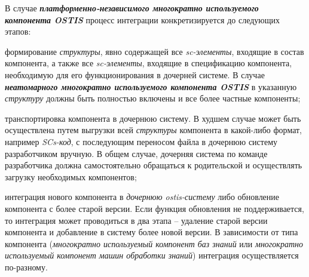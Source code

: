 \begin{SCn}
{В случае \textbf{\textit{платформенно-независимого многократно используемого компонента OSTIS }} процесс интеграции конкретизируется до следующих этапов:
\begin{scnitemize}
    \item формирование \textit{структуры}, явно содержащей все \textit{sc-элементы}, входящие в состав компонента, а также все \textit{sc-элементы}, входящие в спецификацию компонента, необходимую для его функционирования в дочерней системе. В случае \textbf{\textit{неатомарного многократно используемого компонента OSTIS}} в указанную \textit{структуру} должны быть полностью включены и все более частные компоненты;
    \item транспортировка компонента в дочернюю систему. В худшем случае может быть осуществлена путем выгрузки всей \textit{структуры} компонента в какой-либо формат, например \textit{SCs-код}, с последующим переносом файла в дочернюю систему разработчиком вручную. В общем случае, дочерняя система по команде разработчика должна самостоятельно обращаться к родительской и осуществлять загрузку необходимых компонентов;
    \item интеграция нового компонента в \textit{дочернюю ostis-систему} либо обновление компонента с более старой версии. Если функция обновления не поддерживается, то интеграция может проводиться в два этапа – удаление старой версии компонента и добавление в систему более новой версии. В зависимости от типа компонента (\textit{многократно используемый компонент баз знаний} или \textit{многократно используемый компонент машин обработки знаний}) интеграция осуществляется по-разному.
\end{scnitemize}
}





\scnendstruct

\end{SCn}